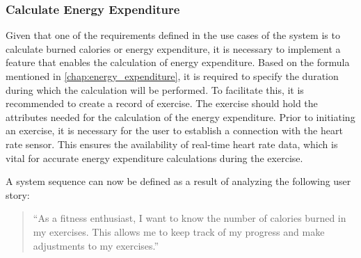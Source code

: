 \subsubsection{Calculate Energy Expenditure}
\label{chap:burnedcalories_design}
Given that one of the requirements defined in the use cases of the system is to calculate burned calories or energy expenditure, it is necessary to implement a feature that enables the calculation of energy expenditure. 
Based on the formula mentioned in \autoref{chap:energy_expenditure}, it is required to specify the duration during which the calculation will be performed. 
To facilitate this, it is recommended to create a record of exercise. The exercise should hold the attributes needed for the calculation of the energy expenditure.
Prior to initiating an exercise, it is necessary for the user to establish a connection with the heart rate sensor. This ensures the availability of real-time heart rate data, which is vital for accurate energy expenditure calculations during the exercise.

A system sequence can now be defined as a result of analyzing the following user story:
\begin{quotation}
    \enquote{As a fitness enthusiast, I want to know the number of calories burned in my exercises. This allows me to keep track of my progress and make adjustments to my exercises.} 
\end{quotation}

